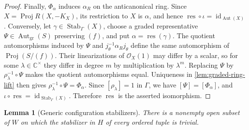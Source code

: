\documentclass[11pt]{article}
\theoremstyle{plain}
\newtheorem{lemma}[lemma]{Lemma}
\theoremstyle{definition}
\theoremstyle{remark}
\newcommand{\C}{\mathbb C}
\newcommand{\OO}{\mathcal O}
\begin{document}
\begin{proof}
Finally, \(\Phi_\alpha\) induces \(\alpha_R\) on the anticanonical ring.
Since \(X=\operatorname{Proj}R(X,-K_X)\), its restriction to \(X\) is
\(\alpha\), and hence
\(\operatorname{res}\circ\iota=\operatorname{id}_{\operatorname{Aut}(X)}\).
Conversely, let \(\gamma\in\operatorname{Stab}_\Gamma(X)\), choose a graded
representative \(\Psi\in\operatorname{Aut}_{\mathrm{gr}}(S)\) preserving
\((f)\), and put \(\alpha=\operatorname{res}(\gamma)\). The quotient
automorphisms induced by \(\Psi\) and \(j_\theta^{-1}\alpha_Rj_\theta\)
define the same automorphism of \(\operatorname{Proj}(S/(f))\). Their
linearizations of \(\OO_X(1)\) may differ by a scalar, so for some
\(\lambda\in\C^\times\) they differ in degree \(m\) by multiplication by
\(\lambda^m\). Replacing \(\Psi\) by
\(\rho_\lambda^{-1}\circ\Psi\) makes the quotient automorphisms equal.
Uniqueness in \cref{lem:graded-ring-lift} then gives
\(\rho_\lambda^{-1}\circ\Psi=\Phi_\alpha\). Since
\([\rho_\lambda]=1\) in \(\Gamma\), we have \([\Psi]=[\Phi_\alpha]\), and
\(\iota\circ\operatorname{res}
=\operatorname{id}_{\operatorname{Stab}_\Gamma(X)}\). Therefore
\(\operatorname{res}\) is the asserted isomorphism.
\end{proof}

\begin{lemma}[Generic configuration stabilizers]
\label{lem:X10-configuration-parameters}
There is a nonempty open subset of \(W\) on which the stabilizer in \(H\)
of every ordered tuple is trivial.
\end{lemma}
\end{document}
